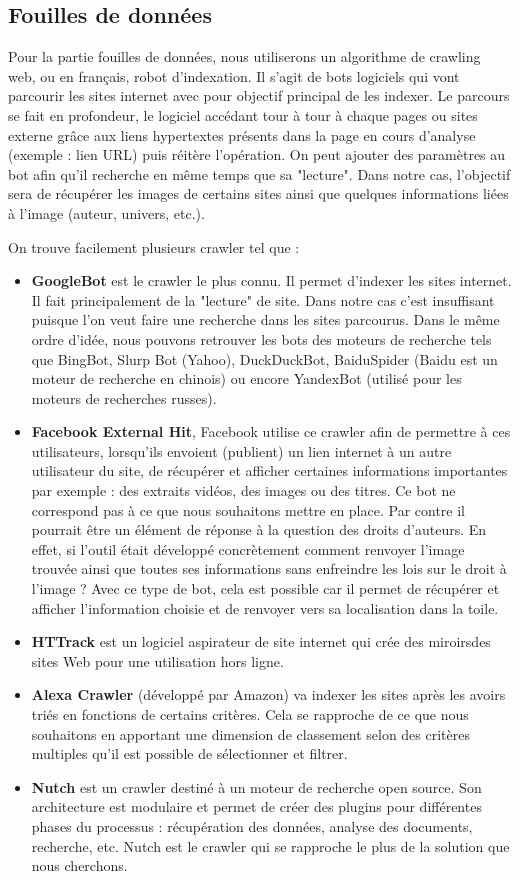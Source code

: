 \documentclass[a4paper,12pt]{article}
\begin{document}
\subsection{Fouilles de données}
Pour la partie fouilles de données, nous utiliserons un algorithme de crawling web, ou en français, robot d'indexation.
Il s’agit de bots logiciels qui vont parcourir les sites internet avec
pour objectif principal de les indexer. Le parcours se fait en profondeur, le
logiciel accédant tour à tour à chaque pages ou sites externe grâce aux liens
hypertextes présents dans la page en cours d’analyse (exemple : lien URL) puis
réitère l’opération. On peut ajouter des paramètres au bot afin qu’il recherche
en même temps que sa "lecture". Dans notre cas, l'objectif sera de récupérer les images de certains sites ainsi que quelques informations liées à l'image (auteur, univers, etc.).

On trouve facilement plusieurs crawler tel que :
\begin{itemize}
    \item \textbf{GoogleBot} est le crawler le plus connu. Il permet d’indexer les sites
internet. Il fait principalement de la "lecture" de site. Dans notre cas c'est insuffisant puisque l'on veut faire une recherche dans les sites parcourus. 
Dans le même ordre d’idée, nous pouvons retrouver les bots des moteurs
de recherche tels que BingBot, Slurp Bot (Yahoo), DuckDuckBot,
BaiduSpider (Baidu est un moteur de recherche en chinois) ou encore
YandexBot (utilisé pour les moteurs de recherches russes).
\item \textbf{Facebook External Hit}, Facebook utilise ce crawler afin de permettre
à ces utilisateurs, lorsqu’ils envoient (publient) un lien internet
à un autre utilisateur du site, de récupérer et afficher certaines
informations importantes par exemple : des extraits vidéos,
des images ou des titres.
Ce bot ne correspond pas à ce que nous souhaitons mettre en place.
Par contre il pourrait être un élément de réponse à la question des
droits d’auteurs. En effet, si l’outil était développé concrètement comment
renvoyer l’image trouvée ainsi que toutes ses informations sans
enfreindre les lois sur le droit à l’image ? Avec ce type de bot, cela est
possible car il permet de récupérer et afficher l’information choisie et
de renvoyer vers sa localisation dans la toile.
\item \textbf{HTTrack} est un logiciel aspirateur de site internet qui crée des miroirsdes sites Web pour une utilisation hors ligne.
\item \textbf{Alexa Crawler} (développé par Amazon) va indexer les sites après
les avoirs triés en fonctions de certains critères. Cela se rapproche de ce que nous souhaitons en apportant une dimension de classement selon des critères multiples qu’il est possible de sélectionner et filtrer.
\item \textbf{Nutch} est un crawler destiné à un moteur de recherche open source.
Son architecture est modulaire et permet de créer des plugins pour différentes phases du processus : récupération des données, analyse des documents, recherche, etc. Nutch est le crawler qui se rapproche le plus de la solution que nous
cherchons.
\end{itemize} 
\end{document}
